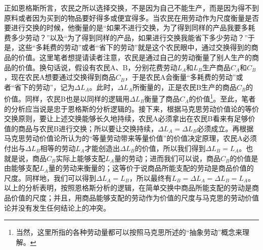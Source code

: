 正如恩格斯所言，农民之所以选择交换，不是因为自己不能生产，而是因为得不到原料或者因为买到的物品要好得多或便宜得多。当农民在用劳动作为尺度衡量是否要进行交换的时候，他衡量的是“如果不进行交换，为了得到同样的产品我要多耗费多少劳动？”以及“为了得到同样的产品，如果进行交换我能省下多少劳动？”于是，这些“多耗费的劳动”或者“省下的劳动”就是这个农民眼中，通过交换得到的商品的价值。这里笔者想提请读者注意，农民是通过自己的劳动衡量了别人生产的商品的价值。换句话说，假设有农民A、B，分别花费劳动$L_A$和$L_B$生产商品$C_A$和$C_B$，现在农民A想要通过交换得到商品$C_B$，于是农民A会衡量“多耗费的劳动”或者“省下的劳动”，记为$\Delta L_A$。此时，$\Delta L_A$所衡量的，正是农民B生产的商品$C_B$的价值。同样，农民B也是以同样的逻辑用$\Delta L_B$衡量了商品$C_A$的价值\footnote{当然，这里所指的各种劳动量都可以按照马克思所述的“抽象劳动”概念来理解。}。至此，笔者的分析应当说是忠于恩格斯的分析逻辑的。接下来，根据马克思劳动价值论的等价交换原则，要让上述交换能够长久地持续，农民A必须拿出在农民B看来有足够价值的商品与农民B进行交换；所以要让交换持续，$\Delta L_A = \Delta L_B$必须成立。再根据马克思劳动价值论所认为的“等量劳动带来等量价值”的价值决定原理，农民A必须付出与$\Delta L_B$相等的劳动$L_A$才能创造出$\Delta L_B$的价值，所以我们得到$\Delta L_B = L_A$。也就是说，商品$C_B$实际上能够支配$L_A$量的劳动；进而我们可以说，商品$C_B$的价值是由能够支配$L_A$量的劳动来衡量的；这等价于说商品所能支配的劳动是商品价值的尺度。同样地，我们可以得到$\Delta L_A = L_B$，所以最终有$L_B =\Delta L_A = \Delta L_B = L_A$。以上的分析表明，按照恩格斯分析的逻辑，在简单交换中商品所能支配的劳动是商品价值的尺度；并且，用商品能够支配的劳动作为价值的尺度与马克思的劳动价值论并没有发生任何结论上的冲突。

